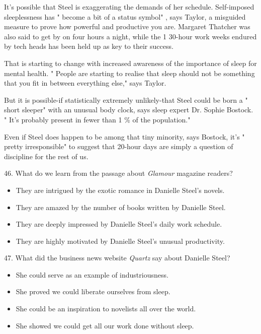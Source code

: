 \documentclass[UTF8,11pt]{ctexart}
\begin{document}
It's possible that Steel is exaggerating the demands of her schedule. Self-imposed sleeplessness has " become a bit of a status symbol" , says Taylor, a misguided measure to prove how powerful and productive you are. Margaret Thatcher was also said to get by on four hours a night, while the 1 30-hour work weeks endured by tech heads has been held up as key to their success.


That is starting to change with increased awareness of the importance of sleep for mental health. " People are starting to realise that sleep should not be something that you fit in between everything else," says Taylor.


But it is possible-if statistically extremely unlikely-that Steel could be born a " short sleeper" with an unusual body clock, says sleep expert Dr. Sophie Bostock. " It's probably present in fewer than 1 \% of the population."


Even if Steel does happen to be among that tiny minority, says Bostock, it's " pretty irresponsible" to suggest that 20-hour days are simply a question of discipline for the rest of us.


46. What do we learn from the passage about \textit{Glamour }magazine readers?


\begin{itemize}[leftmargin=2em,itemsep=.2em,topsep=.4em]\item[A.] They are intrigued by the exotic romance in Danielle Steel's novels.
\item[B.] They are amazed by the number of books written by Danielle Steel.
\item[C.] They are deeply impressed by Danielle Steel's daily work schedule.
\item[D.] They are highly motivated by Danielle Steel's unusual productivity.
\end{itemize}

47. What did the business news website \textit{Quartz }say about Danielle Steel?


\begin{itemize}[leftmargin=2em,itemsep=.2em,topsep=.4em]\item[A.] She could serve as an example of industriousness.
\item[B.] She proved we could liberate ourselves from sleep.
\item[C.] She could be an inspiration to novelists all over the world.
\item[D.] She showed we could get all our work done without sleep.
\end{itemize}
\end{document}
